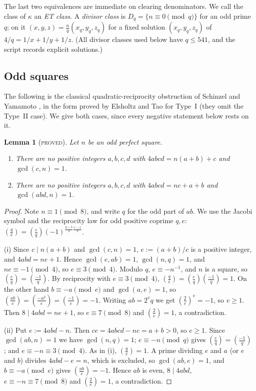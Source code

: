 \documentclass[11pt,reqno]{amsart}
\newtheorem{lemma}[theorem]{Lemma}
\theoremstyle{definition}
\newcommand{\leg}[2]{\left(\frac{#1}{#2}\right)}
\newcommand{\status}[1]{\textup{\textsc{#1}}}
\begin{document}
The last two equivalences are immediate on clearing denominators.  We call
the class of $\kappa$ an \emph{ET class}.  A \emph{divisor class} is
$D_q=\{n\equiv0\pmod q\}$ for an odd prime $q$; on it
$(x,y,z)=\frac nq(x_q,y_q,z_q)$ for a fixed solution $(x_q,y_q,z_q)$ of
$4/q=1/x+1/y+1/z$.  (All divisor classes used below have $q\le 541$, and
the script records explicit solutions.)

\subsection{Odd squares}
The following is the classical quadratic-reciprocity obstruction of
Schinzel and Yamamoto \cite{Yamamoto}, in the form proved by Elsholtz and Tao
for Type~I \cite[\S4]{ET} (they omit the Type~II case).  We give both
cases, since every negative statement below rests on it.

\begin{lemma}[\status{proved}]\label{lem:T1}
Let $n$ be an odd perfect square.
\begin{enumerate}
\item[(i)] There are no positive integers $a,b,c,d$ with
$4abcd=n(a+b)+c$ and $\gcd(c,n)=1$.
\item[(ii)] There are no positive integers $a,b,c,d$ with
$4abcd=nc+a+b$ and $\gcd(abd,n)=1$.
\end{enumerate}
\end{lemma}

\begin{proof}
Note $n\equiv1\pmod8$, and write $q$ for the odd part of $ab$.  We use the
Jacobi symbol and the reciprocity law for odd positive coprime $q,e$:
$\leg qe=\leg eq(-1)^{\frac{q-1}2\frac{e-1}2}$.

(i) Since $c\mid n(a+b)$ and $\gcd(c,n)=1$, $e:=(a+b)/c$ is a positive
integer, and $4abd=ne+1$.  Hence $\gcd(e,ab)=1$, $\gcd(n,q)=1$, and
$ne\equiv-1\pmod 4$, so $e\equiv3\pmod4$.  Modulo $q$, $e\equiv-n^{-1}$, and
$n$ is a square, so $\leg eq=\leg{-1}q$.  By reciprocity with $e\equiv3\pmod
4$, $\leg qe=\leg eq\leg{-1}q=1$.  On the other hand $b\equiv-a\pmod e$ and
$\gcd(a,e)=1$, so $\leg{ab}e=\leg{-a^2}e=\leg{-1}e=-1$.  Writing
$ab=2^vq$ we get $\leg 2e^v=-1$, so $v\ge1$.  Then $8\mid4abd=ne+1$, so
$e\equiv7\pmod8$ and $\leg2e=1$, a contradiction.

(ii) Put $e:=4abd-n$.  Then $ce=4abcd-nc=a+b>0$, so $e\ge1$.  Since
$\gcd(ab,n)=1$ we have $\gcd(n,q)=1$; $e\equiv-n\pmod q$ gives
$\leg eq=\leg{-1}q$; and $e\equiv-n\equiv3\pmod4$.  As in (i),
$\leg qe=1$.  A prime dividing $e$ and $a$ (or $e$ and $b$) divides
$4abd-e=n$, which is excluded, so $\gcd(ab,e)=1$, and $b\equiv-a\pmod e$
gives $\leg{ab}e=-1$.  Hence $ab$ is even, $8\mid 4abd$,
$e\equiv-n\equiv7\pmod8$ and $\leg2e=1$, a contradiction.
\end{proof}
\end{document}
